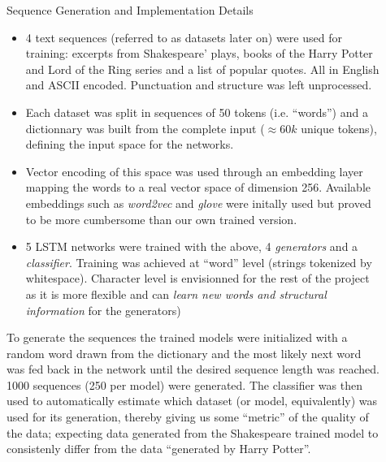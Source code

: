 \documentclass[final]{beamer}
\newlength{\sepwidth}
\newlength{\colwidth}
\newcommand{\separatorcolumn}{\begin{column}{\sepwidth}\end{column}}
\begin{document}
\begin{frame}[t]
\begin{columns}[t]
\begin{column}{\colwidth}
\begin{block}{Sequence Generation and Implementation Details}
    \begin{itemize}
        \item 4 text sequences (referred to as datasets later on) were used for
            training: excerpts from Shakespeare' plays, books of the Harry
            Potter and Lord of the Ring series and a list of popular quotes.
            All in English and ASCII encoded. Punctuation and structure was
            left unprocessed.
        \item Each dataset was split in sequences of 50 tokens (i.e. ``words'') and a
            dictionnary was built from the complete input ($\approx 60k$ unique tokens),
            defining the input space for the networks.
        \item Vector encoding of this space was used through an embedding layer 
            mapping the words to a real vector space of dimension 256. Available
            embeddings such as \textit{word2vec} and \textit{glove} were 
            initally used but proved to be more cumbersome than our own 
            trained version.
        \item 5 LSTM networks were trained with the above, 4
            \textit{generators} and a \textit{classifier}. Training
            was achieved at ``word'' level (strings tokenized by whitespace).
            Character level is envisionned for the rest of the project as it is
            more flexible and can \textit{learn new words and structural
            information} \cite{gravesGenerating} for the generators)
    \end{itemize}
To generate the sequences the trained models were initialized with a random word
drawn from the dictionary and the most likely next word was fed back in the network
until the desired sequence length was reached. 1000 sequences (250 per model) were
generated. The classifier was then used to automatically estimate which
dataset (or model, equivalently) was used for its generation, thereby giving us
some ``metric'' of the quality of the data; expecting data generated from the
Shakespeare trained model to consistenly differ from the data ``generated by
Harry Potter''.
\end{block}
\end{column}

\separatorcolumn

\begin{column}{\colwidth}


\end{column}
\end{columns}
\end{frame}
\end{document}
